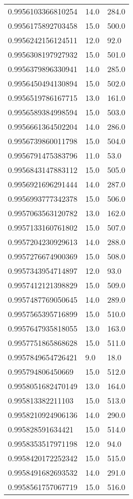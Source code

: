 \begin{center}
\begin{supertabular}[H]{p{0.30\textwidth}p{0.05\textwidth}p{0.05\textwidth}}
0.9956103366810254 & 14.0 & 284.0 \\ 
0.9956175892703458 & 15.0 & 500.0 \\ 
0.9956242156124511 & 12.0 & 92.0 \\ 
0.9956308197927932 & 15.0 & 501.0 \\ 
0.9956379896330941 & 14.0 & 285.0 \\ 
0.9956450494130894 & 15.0 & 502.0 \\ 
0.9956519786167715 & 13.0 & 161.0 \\ 
0.9956589384998594 & 15.0 & 503.0 \\ 
0.9956661364502204 & 14.0 & 286.0 \\ 
0.9956739860011798 & 15.0 & 504.0 \\ 
0.9956791475383796 & 11.0 & 53.0 \\ 
0.9956843147883112 & 15.0 & 505.0 \\ 
0.9956921696291444 & 14.0 & 287.0 \\ 
0.9956993777342378 & 15.0 & 506.0 \\ 
0.9957063563120782 & 13.0 & 162.0 \\ 
0.9957133160761802 & 15.0 & 507.0 \\ 
0.9957204230929613 & 14.0 & 288.0 \\ 
0.9957276674900369 & 15.0 & 508.0 \\ 
0.9957343954714897 & 12.0 & 93.0 \\ 
0.9957412121398829 & 15.0 & 509.0 \\ 
0.9957487769050645 & 14.0 & 289.0 \\ 
0.9957565395716899 & 15.0 & 510.0 \\ 
0.9957647935818055 & 13.0 & 163.0 \\ 
0.9957751865868628 & 15.0 & 511.0 \\ 
0.9957849654726421 & 9.0 & 18.0 \\ 
0.995794806450669 & 15.0 & 512.0 \\ 
0.9958051682470149 & 13.0 & 164.0 \\ 
0.995813382211103 & 15.0 & 513.0 \\ 
0.9958210924906136 & 14.0 & 290.0 \\ 
0.995828591634421 & 15.0 & 514.0 \\ 
0.9958353517971198 & 12.0 & 94.0 \\ 
0.9958420172252342 & 15.0 & 515.0 \\ 
0.9958491682693532 & 14.0 & 291.0 \\ 
0.9958561757067719 & 15.0 & 516.0 \\ 

\end{supertabular}
\end{center}
